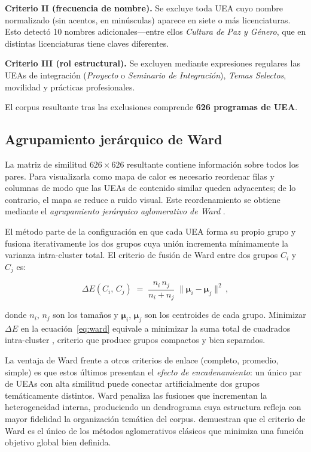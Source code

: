 \documentclass[11pt,a4paper]{article}
\begin{document}
\textbf{Criterio II (frecuencia de nombre).}
Se excluye toda UEA cuyo nombre normalizado (sin acentos, en minúsculas) aparece en siete o más licenciaturas.
Esto detectó 10 nombres adicionales---entre ellos \textit{Cultura de Paz y Género}, que en distintas licenciaturas tiene claves diferentes.

\textbf{Criterio III (rol estructural).}
Se excluyen mediante expresiones regulares las UEAs de integración (\textit{Proyecto} o \textit{Seminario de Integración}), \textit{Temas Selectos}, movilidad y prácticas profesionales.

El corpus resultante tras las exclusiones comprende \textbf{626 programas de UEA}.

\subsection{Agrupamiento jerárquico de Ward}

La matriz de similitud $626 \times 626$ resultante contiene información sobre todos los pares.
Para visualizarla como mapa de calor es necesario reordenar filas y columnas de modo que las UEAs de contenido similar queden adyacentes; de lo contrario, el mapa se reduce a ruido visual.
Este reordenamiento se obtiene mediante el \textit{agrupamiento jerárquico aglomerativo de Ward} \citep{Ward1963}.

El método parte de la configuración en que cada UEA forma su propio grupo y fusiona iterativamente los dos grupos cuya unión incrementa mínimamente la varianza intra-cluster total.
El criterio de fusión de Ward entre dos grupos $C_i$ y $C_j$ es:

\begin{equation}
  \Delta E(C_i,\,C_j) \;=\;
  \frac{n_i\,n_j}{n_i + n_j}
  \;\bigl\|\boldsymbol{\mu}_i - \boldsymbol{\mu}_j\bigr\|^2\,,
  \label{eq:ward}
\end{equation}

donde $n_i$, $n_j$ son los tamaños y $\boldsymbol{\mu}_i$, $\boldsymbol{\mu}_j$ son los centroides de cada grupo.
Minimizar $\Delta E$ en la ecuación~\eqref{eq:ward} equivale a minimizar la suma total de cuadrados intra-cluster \citep{Murtagh2014}, criterio que produce grupos compactos y bien separados.

La ventaja de Ward frente a otros criterios de enlace (completo, promedio, simple) es que estos últimos presentan el \textit{efecto de encadenamiento}: un único par de UEAs con alta similitud puede conectar artificialmente dos grupos temáticamente distintos.
Ward penaliza las fusiones que incrementan la heterogeneidad interna, produciendo un dendrograma cuya estructura refleja con mayor fidelidad la organización temática del corpus.
\citet{Murtagh2014} demuestran que el criterio de Ward es el único de los métodos aglomerativos clásicos que minimiza una función objetivo global bien definida.
\end{document}

